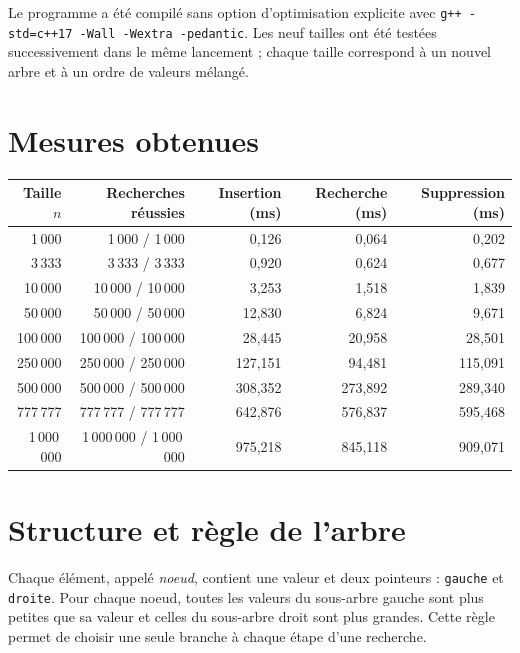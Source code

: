 \documentclass[10pt,a4paper]{article}
\begin{document}
Le programme a été compilé sans option d'optimisation explicite avec
\texttt{g++ -std=c++17 -Wall -Wextra -pedantic}. Les neuf tailles ont été
testées successivement dans le même lancement ; chaque taille correspond
à un nouvel arbre et à un ordre de valeurs mélangé.

\section{Mesures obtenues}
\small
\renewcommand{\arraystretch}{1.12}
\begin{center}
\begin{tabular}{@{}r r r r r@{}}
\toprule
\textbf{Taille $n$} & \textbf{Recherches réussies} &
\textbf{Insertion (ms)} & \textbf{Recherche (ms)} &
\textbf{Suppression (ms)}\\
\midrule
1\,000      & 1\,000 / 1\,000      & 0,126   & 0,064   & 0,202\\
3\,333      & 3\,333 / 3\,333      & 0,920   & 0,624   & 0,677\\
10\,000     & 10\,000 / 10\,000    & 3,253   & 1,518   & 1,839\\
50\,000     & 50\,000 / 50\,000    & 12,830  & 6,824   & 9,671\\
100\,000    & 100\,000 / 100\,000  & 28,445  & 20,958  & 28,501\\
250\,000    & 250\,000 / 250\,000  & 127,151 & 94,481  & 115,091\\
500\,000    & 500\,000 / 500\,000  & 308,352 & 273,892 & 289,340\\
777\,777    & 777\,777 / 777\,777  & 642,876 & 576,837 & 595,468\\
1\,000\,000 & 1\,000\,000 / 1\,000\,000 & 975,218 & 845,118 & 909,071\\
\bottomrule
\end{tabular}
\end{center}

\newpage
\section{Structure et règle de l'arbre}
Chaque élément, appelé \emph{noeud}, contient une valeur et deux pointeurs :
\texttt{gauche} et \texttt{droite}. Pour chaque noeud, toutes les valeurs
du sous-arbre gauche sont plus petites que sa valeur et celles du sous-arbre
droit sont plus grandes. Cette règle permet de choisir une seule branche
à chaque étape d'une recherche.
\end{document}
